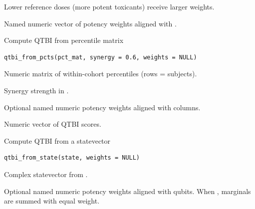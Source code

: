 \documentclass[a4paper]{book}
\begin{document}
%
\begin{Details}
Lower reference doses (more potent toxicants) receive larger weights.
\end{Details}
%
\begin{Value}
Named numeric vector of potency weights aligned with .
\end{Value}
%
\begin{Description}
Compute QTBI from percentile matrix
\end{Description}
%
\begin{Usage}
\begin{verbatim}
qtbi_from_pcts(pct_mat, synergy = 0.6, weights = NULL)
\end{verbatim}
\end{Usage}
%
\begin{Arguments}
\begin{ldescription}
\item[\code{pct\_mat}] Numeric matrix of within-cohort percentiles (rows = subjects).

\item[\code{synergy}] Synergy strength in \AsIs{\texttt{[0, 1]}}.

\item[\code{weights}] Optional named numeric potency weights aligned with columns.
\end{ldescription}
\end{Arguments}
%
\begin{Value}
Numeric vector of QTBI scores.
\end{Value}
%
\begin{Description}
Compute QTBI from a statevector
\end{Description}
%
\begin{Usage}
\begin{verbatim}
qtbi_from_state(state, weights = NULL)
\end{verbatim}
\end{Usage}
%
\begin{Arguments}
\begin{ldescription}
\item[\code{state}] Complex statevector from .

\item[\code{weights}] Optional named numeric potency weights aligned with qubits.
When , marginals are summed with equal weight.
\end{ldescription}
\end{Arguments}
\end{document}
